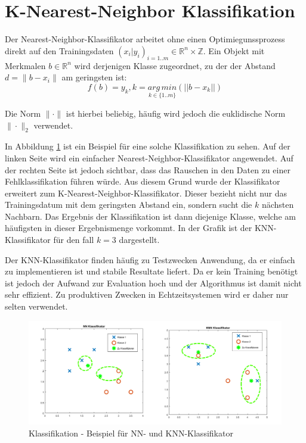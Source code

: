 \section{K-Nearest-Neighbor Klassifikation}
Der Nearest-Neighbor-Klassifikator arbeitet ohne einen Optimiegunssprozess direkt auf den Trainingsdaten \( (x_i | y_i)_{i=1..m} \in \mathbb{R}^n \times \mathbb{Z} \). Ein Objekt mit Merkmalen \(b \in \mathbb{R}^n\) wird derjenigen Klasse zugeordnet, zu der der Abstand \(d=\|b-x_i\| \) am geringsten ist:
\begin{equation*}
 f(b)= y_k, k=\underset{{k \in \{1..m\}}}{arg\,min} (||b-x_k||)
\end{equation*}

Die Norm \(\| \cdot \| \) ist hierbei beliebig, h\"aufig wird jedoch die euklidische Norm \(\| \cdot \|_2 \) verwendet.

In Abbildung \ref{fig:classification_knn} ist ein Beispiel f\"ur eine solche Klassifikation zu sehen. Auf der linken Seite wird ein einfacher Nearest-Neighbor-Klassifikator angewendet. Auf der rechten Seite ist jedoch sichtbar, dass das Rauschen in den Daten zu einer Fehlklassifikation f\"uhren w\"urde. Aus diesem Grund wurde der Klassifikator erweitert zum K-Nearest-Neighbor-Klassifikator. Dieser bezieht nicht nur das Trainingsdatum mit dem geringsten Abstand ein, sondern sucht die \(k\) n\"achsten Nachbarn. Das Ergebnis der Klassifikation ist dann diejenige Klasse, welche am h\"aufigsten in dieser Ergebnismenge vorkommt. In der Grafik ist der KNN-Klassifikator f\"ur den fall \(k=3\) dargestellt.

Der KNN-Klassifikator finden h\"aufig zu Testzwecken Anwendung, da er einfach zu implementieren ist und stabile Resultate liefert. Da er kein Training ben\"otigt ist jedoch der Aufwand zur Evaluation hoch und der Algorithmus ist damit nicht sehr effizient. Zu produktiven Zwecken in Echtzeitsystemen wird er daher nur selten verwendet.

\begin{figure}
 \centering
 \includegraphics[width=1\textwidth]{media/classification/knn_example.png}
 \caption{Klassifikation - Beispiel f\"ur NN- und KNN-Klassifikator}
 \label{fig:classification_knn}
\end{figure}

